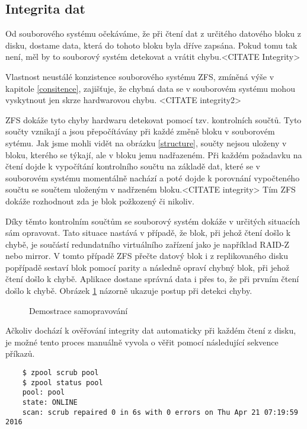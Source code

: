     \subsection{Integrita dat}
    \label{checksum}
    Od souborového systému očekáváme, že při čtení dat z určitého datového bloku z disku, dostame data, která do tohoto bloku byla dříve zapsána. Pokud tomu tak není, měl by to souborový systém detekovat a vrátit chybu.<CITATE Integrity>

    Vlastnost neustálé konzistence souborového systému ZFS, zmíněná výše v kapitole \ref{consitence}, zajišťuje, že chybná data se v souborovém systému mohou vyskytnout jen skrze hardwarovou chybu. <CITATE integrity2>

    ZFS dokáže tyto chyby hardwaru detekovat pomocí tzv. kontrolních součtů. Tyto součty vznikají a jsou přepočítávány při každé změně bloku v souborovém sytému. Jak jsme mohli vidět na obrázku \ref{structure}, součty nejsou uloženy v bloku, kterého se týkají, ale v bloku jemu nadřazeném. Při každém požadavku na čtení dojde k vypočítání kontrolního součtu na základě dat, které se v souborovém systému momentálně nachází a poté dojde k porovnání vypočteného součtu se součtem uloženým v nadřzeném bloku.<CITATE integrity> Tím ZFS dokáže rozhodnout zda je blok požkozený či nikoliv.

    Díky těmto kontrolním součtům se souborový systém dokáže v určitých situacích sám opravovat. Tato situace nastává v případě, že blok, při jehož čtení došlo k chybě, je součástí redundatního virtuálního zařízení jako je například RAID-Z nebo mirror. V tomto případě ZFS přečte datový blok i z replikovaného disku popřípadě sestaví blok pomocí parity a následně opraví chybný blok, při jehož čtení došlo k chybě. Aplikace dostane správná data i přes to, že při prvním čtení došlo k chybě. Obrázek \ref{selfhealing} názorně ukazuje postup při detekci chyby.
    \begin{figure}[h]
        \caption{Demostrace samopravování}
        \label{selfhealing}
    \end{figure}

    Ačkoliv dochází k ověřování integrity dat automaticky při každém čtení z disku, je možné tento proces manuálně vyvola o věřit pomocí následující sekvence příkazů.
    \begin{verbatim}
    $ zpool scrub pool
    $ zpool status pool
    pool: pool
    state: ONLINE
    scan: scrub repaired 0 in 6s with 0 errors on Thu Apr 21 07:19:59 2016
    \end{verbatim}

